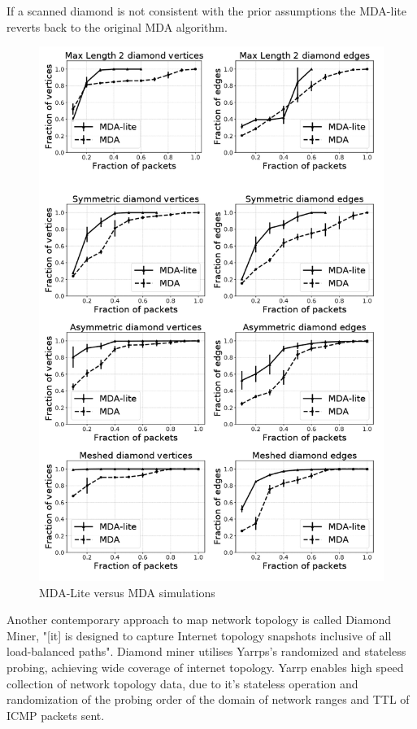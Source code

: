 If a scanned diamond is not consistent with the prior assumptions the MDA-lite reverts back to the original MDA algorithm. 

\begin{figure}[!ht]
  \begin{center}
    \includegraphics[scale=0.3]{images/MDA_lite.png}
    \caption{MDA-Lite versus MDA simulations\cite{MDA-lite}}
    \label{figure:MDA_lite_fig}
  \end{center}
\end{figure}

Another contemporary approach to map network topology is called Diamond Miner, "[it] is designed to capture Internet topology snapshots inclusive of all load-balanced paths". \cite{diamond-miner} Diamond miner utilises Yarrps's randomized and stateless probing, achieving wide coverage of internet topology. Yarrp enables high speed collection of network topology data, due to it's stateless operation and randomization of the probing order of the domain of network ranges and TTL of ICMP packets sent. \cite{yarrp}

